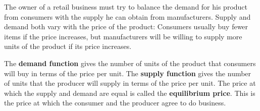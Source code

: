 \documentclass[10pt,]{book}
\newcommand{\terminology}[1]{\textbf{#1}}
\theoremstyle{plain}
\theoremstyle{definition}
\theoremstyle{definition}
\theoremstyle{definition}
\theoremstyle{definition}
\numberwithin{equation}{section}
\begin{document}
	The owner of a retail business must try to balance the demand for his product from consumers with the supply he can obtain from manufacturers. Supply and demand both vary with the price of the product: Consumers usually buy fewer items if the price increases, but manufacturers will be willing to supply more units of the product if its price increases.
%
\par

	The \terminology{demand function} gives the number of units of the product that consumers will buy in terms of the price per unit. The \terminology{supply function} gives the number of units that the producer will supply in terms of the price per unit. The price at which the supply and demand are equal is called the \terminology{equilibrium price}. This is the price at which the consumer and the producer agree to do business.
%
\end{document}
